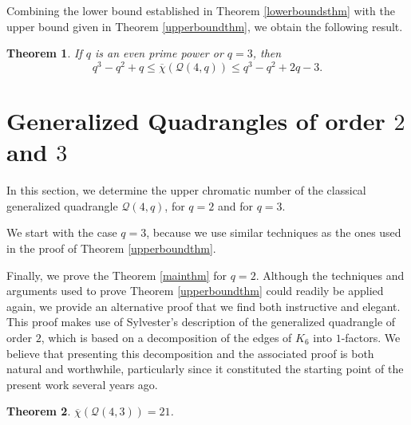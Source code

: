 \documentclass[12pt]{article}
\newtheorem{theorem}{Theorem}[section]
\begin{document}
{Combining the lower bound established in Theorem \ref{lowerboundsthm} with the upper bound given in Theorem \ref{upperboundthm}, we obtain the following result.}

\begin{theorem}\label{cor:cotas}
If $q$ is an even prime power or $q=3$, then
$$q^3-q^2+q\le\overline{\chi}(\mathcal{Q}(4,q))\le  q^3-q^2+2q-3.$$
\end{theorem}

\section{Generalized  Quadrangles of order $2$ and $3$}
\label{q2y3}

In this section, we determine the upper chromatic number of the classical generalized quadrangle $\mathcal{Q}(4,q)$, for $q=2$ and {for} $q=3$. 

We {start} with {the case} $q=3$, because we use similar techniques as the ones used in the proof of Theorem \ref{upperboundthm}.

Finally, we prove the Theorem {\ref{mainthm}} for $q=2$. Although the techniques and arguments used to prove Theorem \ref{upperboundthm} could readily be applied again, we provide an alternative proof that we find both instructive and elegant. This proof makes use of Sylvester’s description of the generalized quadrangle of order $2$, which is based on a decomposition of the edges of $K_6$ into $1$-factors. We believe that presenting this decomposition and the associated proof is both natural and worthwhile, particularly since it constituted the starting point of the present work several years ago.

\begin{theorem}\label{teo:q=3}
    $ \overline{\chi}(\mathcal{Q}(4,3))=21$.
\end{theorem}
\end{document}
